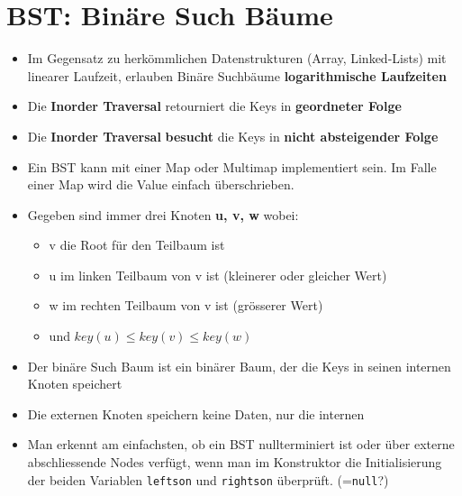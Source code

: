 \section{BST: Binäre Such Bäume}
\begin{itemize}
	\item Im Gegensatz zu herkömmlichen Datenstrukturen (Array, Linked-Lists) mit linearer Laufzeit, erlauben Binäre Suchbäume \textbf{logarithmische Laufzeiten}
	\item Die \textbf{Inorder Traversal} retourniert die Keys in \textbf{geordneter Folge}
	\item Die \textbf{Inorder Traversal} \textbf{besucht} die Keys in \textbf{nicht absteigender Folge}
	\item Ein BST kann mit einer Map oder Multimap implementiert sein. Im Falle einer Map wird die Value einfach überschrieben.
	\item Gegeben sind immer drei Knoten \textbf{u, v, w} wobei:
	\begin{itemize}
		\item v die Root für den Teilbaum ist
		\item u im linken Teilbaum von v ist (kleinerer oder gleicher Wert)
		\item w im rechten Teilbaum von v ist (grösserer Wert)
		\item und $key(u) \leq key(v) \leq key(w)$
	\end{itemize}
	\item Der binäre Such Baum ist ein binärer Baum, der die Keys in seinen internen Knoten speichert
	\item Die externen Knoten speichern keine Daten, nur die internen
	\item Man erkennt am einfachsten, ob ein BST nullterminiert ist oder über externe abschliessende Nodes verfügt, wenn man im Konstruktor die Initialisierung der beiden Variablen \lstinline|leftson| und \lstinline|rightson| überprüft. (=\lstinline|null|?)
\end{itemize}


